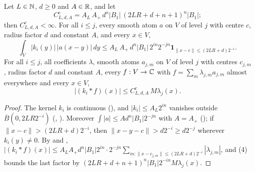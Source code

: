 \begin{lemma}
\label{lem:coarse-local-means-atoms}
\leanok
{}
Let $L \in \mathbb{N}$, $d \geq 0$ and $A \in \mathbb{R}$, and let
\[
  C^{\mathrm c}_{L,d,A} = A_L \, A_+ \, d^n |B_1| \, (2LR + d + n + 1)^n |B_1| ;
\]
then $C^{\mathrm c}_{L,d,A} < \infty$. For all $i \leq j$, every smooth atom $a$ on $V$ of level
$j$ with centre $c$, radius factor $d$ and constant $A$, and every $x \in V$,
\[
  \int_V |k_i(y)| \, |a(x - y)| \, dy \leq A_L \, A_+ \, d^n |B_1| \, 2^{in} 2^{-jn}
  \mathbf 1_{\|x - c\| \leq (2LR + d) 2^{-i}} .
\]
For all $i \leq j$, all coefficients $\lambda$, smooth atoms $a_{j,m}$ on $V$ of level $j$ with
centres $c_{j,m}$, radius factor $d$ and constant $A$, every $f : V \to \mathbb{C}$ with
$f = \sum_m \lambda_{j,m} a_{j,m}$ almost everywhere and every $x \in V$,
\[
  |(k_i * f)(x)| \leq C^{\mathrm c}_{L,d,A} \, M \lambda_j(x) .
\]
\end{lemma}

\begin{proof}
\leanok
The kernel $k_i$ is continuous (), and
$|k_i| \leq A_L 2^{in}$ vanishes outside $\overline B(0, 2LR 2^{-i})$
(, ). Moreover
$\int |a| \leq A d^n |B_1| 2^{-jn}$ with $A = A_+$ (); if
$\|x - c\| > (2LR + d) 2^{-i}$, then $\|x - y - c\| > d 2^{-i} \geq d 2^{-j}$ wherever
$k_i(y) \neq 0$. By  and ,
$|(k_i * f)(x)| \leq A_L A_+ d^n |B_1| 2^{in} \cdot 2^{-jn}
\sum_{m : \|x - c_{j,m}\| \leq (2LR + d) 2^{-i}} |\lambda_{j,m}|$, and
 (4) bounds the last factor by
$(2LR + d + n + 1)^n |B_1| 2^{-in} M \lambda_j(x)$.
\end{proof}

